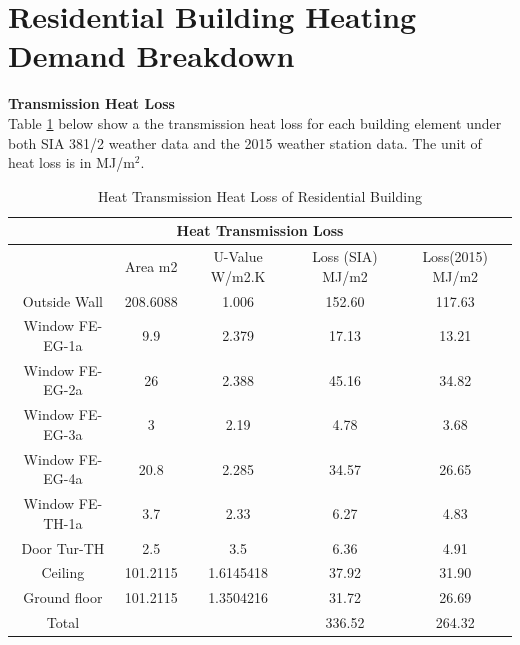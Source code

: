 \documentclass[a4paper, oneside]{discothesis}
\begin{document}
	\section{Residential Building Heating Demand Breakdown}		
		\textbf{Transmission Heat Loss}\\
		Table \ref{tab:HonggTransmission} below show a the transmission heat loss for each building element under both SIA 381/2 weather data and the 2015 weather station data. The unit of heat loss is in MJ/m$^2$.
		\begin{table}[htbp]
		\small
		\centering
		\caption{Heat Transmission Heat Loss of Residential Building}
		    \begin{tabular}{|ccccc|}
		    \toprule
		    \multicolumn{5}{|c|}{\textbf{Heat Transmission Loss}} \\
		    \midrule
		          & \multicolumn{1}{p{4.785em}}{Area m2} & \multicolumn{1}{p{4.785em}}{U-Value W/m2.K} & \multicolumn{1}{p{5.715em}}{Loss (SIA) MJ/m2} & \multicolumn{1}{p{5.715em}|}{Loss(2015) MJ/m2} \\
		    \midrule
		    Outside Wall & 208.6088 & 1.006 & 152.60 & 117.63 \\
		    Window FE-EG-1a & 9.9   & 2.379 & 17.13 & 13.21 \\
		    Window FE-EG-2a & 26    & 2.388 & 45.16 & 34.82 \\
		    Window FE-EG-3a & 3     & 2.19  & 4.78  & 3.68 \\
		    Window FE-EG-4a & 20.8  & 2.285 & 34.57 & 26.65 \\
		    Window FE-TH-1a & 3.7   & 2.33  & 6.27  & 4.83 \\
		    Door Tur-TH & 2.5   & 3.5   & 6.36  & 4.91 \\
		    Ceiling & 101.2115 & 1.6145418 & 37.92 & 31.90 \\
		    Ground floor & 101.2115 & 1.3504216 & 31.72 & 26.69 \\
		    \midrule
		    Total &       &       & 336.52 & 264.32 \\
		    \bottomrule
		    \end{tabular}%
		  \label{tab:HonggTransmission}%
		\end{table}%
\end{document}
